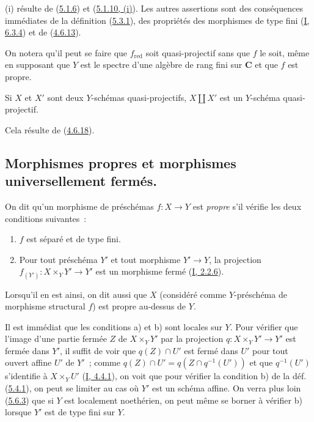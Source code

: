 (i) résulte de (\hyperref[II.5.1.6-fr]{5.1.6}) et
(\hyperref[II.5.1.10-fr]{5.1.10, (i)}). Les autres assertions sont des
conséquences immédiates de la définition (\hyperref[II.5.3.1-fr]{5.3.1}),
des propriétés des morphismes de type fini (\hyperref[I.6.3.4-fr]{I, 6.3.4})
et de (\hyperref[II.4.6.13-fr]{4.6.13}).

\begin{remark}[5.3.5]
\label{II.5.3.5-fr}
On notera qu'il peut se faire que $f_{\mathrm{red}}$ soit quasi-projectif
sans que $f$ le soit, même en supposant que $Y$ est le spectre d'une algèbre
de rang fini sur $\mathbf{C}$ et que $f$ est propre.
\end{remark}

\begin{corollary}[5.3.6]
\label{II.5.3.6-fr}
Si $X$ et $X'$ sont deux $Y$-schémas quasi-projectifs, $X\amalg X'$ est un
$Y$-schéma quasi-projectif.
\end{corollary}

Cela résulte de (\hyperref[II.4.6.18-fr]{4.6.18}).

\subsection{Morphismes propres et morphismes universellement fermés.}
\label{subsection:II.5.4-fr}
\label{II.5.4-fr}

\begin{definition}[5.4.1]
\label{II.5.4.1-fr}
On dit qu'un morphisme de préschémas $f:X\to Y$ est \emph{propre} s'il
vérifie les deux conditions suivantes~:
\begin{enumerate}
  \item[\rm{a)}] $f$ est séparé et de type fini.
  \item[\rm{b)}] Pour tout préschéma $Y'$ et tout morphisme $Y'\to Y$, la
  projection $f_{(Y')}:X\times_YY'\to Y'$ est un morphisme fermé
  (\hyperref[I.2.2.6-fr]{I, 2.2.6}).
\end{enumerate}
Lorsqu'il en est ainsi, on dit aussi que $X$ (considéré comme $Y$-préschéma
de morphisme structural $f$) est propre au-dessus de $Y$.
\end{definition}

Il est immédiat que les conditions a) et b) sont locales sur $Y$. Pour
vérifier que l'image d'une partie fermée $Z$ de $X\times_YY'$ par la
projection $q:X\times_YY'\to Y'$ est fermée dans $Y'$, il suffit de voir que
$q(Z)\cap U'$ est fermé dans $U'$ pour tout ouvert affine $U'$ de $Y'$~;
comme $q(Z)\cap U'=q(Z\cap q^{-1}(U'))$ et que $q^{-1}(U')$ s'identifie à
$X\times_YU'$ (\hyperref[I.4.4.1-fr]{I, 4.4.1}), on voit que pour vérifier
la condition b) de la déf. (\hyperref[II.5.4.1-fr]{5.4.1}), on peut se
limiter au cas où $Y'$ est un schéma affine. On verra plus loin
(\hyperref[II.5.6.3-fr]{5.6.3}) que si $Y$ est localement noethérien, on
peut même se borner à vérifier b) lorsque $Y'$ est de type fini sur $Y$.

